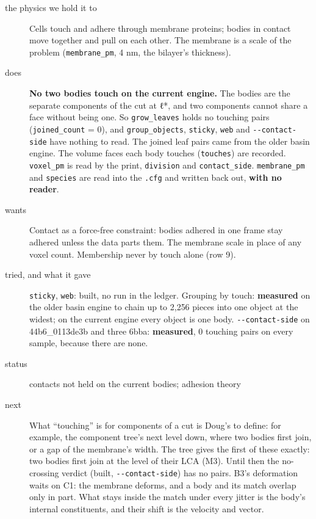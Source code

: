 \begin{description}
\item[{the physics we hold it to}] Cells touch and adhere through membrane proteins; bodies in contact move together and pull on each other. The membrane is a scale of the problem (\texttt{membrane\_\allowbreak{}pm}, 4 nm, the bilayer's thickness).
\item[{does}] \textbf{No two bodies touch on the current engine.} The bodies are the separate components of the cut at ℓ*, and two components cannot share a face without being one. So \texttt{grow\_\allowbreak{}leaves} holds no touching pairs (\texttt{joined\_\allowbreak{}count} = 0), and \texttt{group\_\allowbreak{}objects}, \texttt{sticky}, \texttt{web} and \texttt{-\allowbreak{}-\allowbreak{}contact-\allowbreak{}side} have nothing to read. The joined leaf pairs came from the older basin engine. The volume faces each body touches (\texttt{touches}) are recorded. \texttt{voxel\_\allowbreak{}pm} is read by the print, \texttt{division} and \texttt{contact\_\allowbreak{}side}. \texttt{membrane\_\allowbreak{}pm} and \texttt{species} are read into the \texttt{.\allowbreak{}cfg} and written back out, \textbf{with no reader}.
\item[{wants}] Contact as a force-free constraint: bodies adhered in one frame stay adhered unless the data parts them. The membrane scale in place of any voxel count. Membership never by touch alone (row 9).
\item[{tried, and what it gave}] \texttt{sticky}, \texttt{web}: built, no run in the ledger. Grouping by touch: \textbf{measured} on the older basin engine to chain up to 2,256 pieces into one object at the widest; on the current engine every object is one body. \texttt{-\allowbreak{}-\allowbreak{}contact-\allowbreak{}side} on 44b6\_\allowbreak{}0113de3b and three 6bba: \textbf{measured}, 0 touching pairs on every sample, because there are none.
\item[{status}] contacts not held on the current bodies; adhesion theory
\item[{next}] What “touching” is for components of a cut is Doug's to define: for example, the component tree's next level down, where two bodies first join, or a gap of the membrane's width. The tree gives the first of these exactly: two bodies first join at the level of their LCA (M3). Until then the no-crossing verdict (built, \texttt{-\allowbreak{}-\allowbreak{}contact-\allowbreak{}side}) has no pairs. B3's deformation waits on C1: the membrane deforms, and a body and its match overlap only in part. What stays inside the match under every jitter is the body's internal constituents, and their shift is the velocity and vector.
\end{description}

